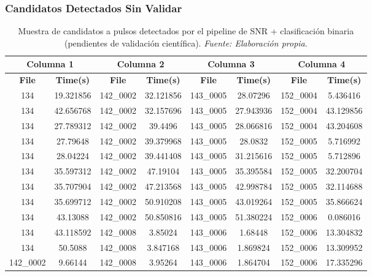 \subsubsection{Candidatos Detectados Sin Validar}

\begin{table}[H]
    \centering
    \caption{Muestra de candidatos a pulsos detectados por el pipeline de SNR + clasificación binaria (pendientes de validación científica). \textit{Fuente: Elaboración propia}.}
    \label{tab:anexo_alma_candidate_pulses}
    \begin{tabular}{|c|c|c|c|c|c|c|c|}
        \hline
        \multicolumn{2}{|c|}{\textbf{Columna 1}} & \multicolumn{2}{|c|}{\textbf{Columna 2}} & \multicolumn{2}{|c|}{\textbf{Columna 3}} & \multicolumn{2}{|c|}{\textbf{Columna 4}} \\
        \hline
        \textbf{File} & \textbf{Time(s)} & \textbf{File} & \textbf{Time(s)} & \textbf{File} & \textbf{Time(s)} & \textbf{File} & \textbf{Time(s)} \\
        \hline
        134 & 19.321856 & 142\_0002 & 32.121856 & 143\_0005 & 28.07296 & 152\_0004 & 5.436416 \\
        134 & 42.656768 & 142\_0002 & 32.157696 & 143\_0005 & 27.943936 & 152\_0004 & 43.129856 \\
        134 & 27.789312 & 142\_0002 & 39.4496 & 143\_0005 & 28.066816 & 152\_0004 & 43.204608 \\
        134 & 27.79648 & 142\_0002 & 39.379968 & 143\_0005 & 28.0832 & 152\_0005 & 5.716992 \\
        134 & 28.04224 & 142\_0002 & 39.441408 & 143\_0005 & 31.215616 & 152\_0005 & 5.712896 \\
        134 & 35.597312 & 142\_0002 & 47.19104 & 143\_0005 & 35.395584 & 152\_0005 & 32.200704 \\
        134 & 35.707904 & 142\_0002 & 47.213568 & 143\_0005 & 42.998784 & 152\_0005 & 32.114688 \\
        134 & 35.699712 & 142\_0002 & 50.910208 & 143\_0005 & 43.019264 & 152\_0005 & 35.866624 \\
        134 & 43.13088 & 142\_0002 & 50.850816 & 143\_0005 & 51.380224 & 152\_0006 & 0.086016 \\
        134 & 43.118592 & 142\_0008 & 3.85024 & 143\_0006 & 1.68448 & 152\_0006 & 13.304832 \\
        134 & 50.5088 & 142\_0008 & 3.847168 & 143\_0006 & 1.869824 & 152\_0006 & 13.309952 \\
        142\_0002 & 9.66144 & 142\_0008 & 3.95264 & 143\_0006 & 1.864704 & 152\_0006 & 17.335296 \\

\end{tabular}
\end{table}
